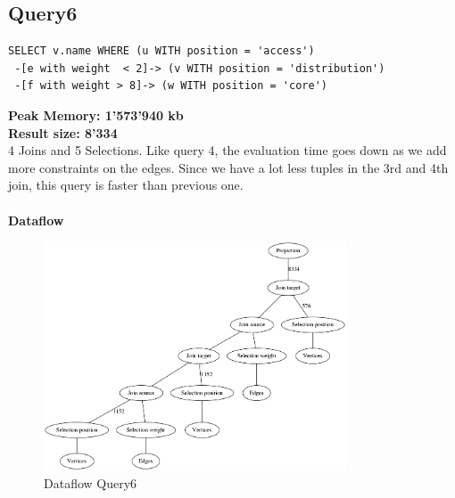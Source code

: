 \documentclass[11pt,singlecolumn]{scrartcl}
\begin{document}
\subsection{Query6}
\begin{verbatim}
SELECT v.name WHERE (u WITH position = 'access')
 -[e with weight  < 2]-> (v WITH position = 'distribution')
 -[f with weight > 8]-> (w WITH position = 'core')\end{verbatim}
\textbf{Peak Memory: 1'573'940 kb}\\
\textbf{Result size: 8'334}\\
4 Joins and 5 Selections. Like query 4, the evaluation time goes down as we add more constraints on the edges. Since we have a lot less tuples in the 3rd and 4th join, this query is faster than previous one.\\\\
\textbf{Dataflow}
\begin{figure}[H]
\includegraphics[width=0.8\textwidth]{graph6}
\caption{Dataflow Query6}
\end{figure}
\clearpage
\end{document}
